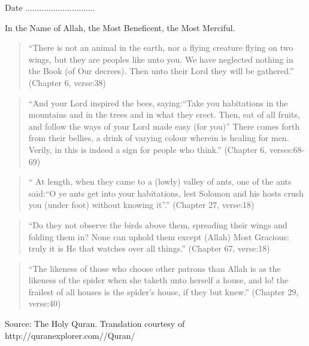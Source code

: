 \begin{titlepage}
\newline
Date ..............................\\
\newpage
\thispagestyle{empty}	
\begin{center}
\noindent
\large
In the Name of Allah, the Most Beneficent, the Most Merciful.
\HRule
\end{center}
\begin{verse}
``There is not an animal in the earth, nor a flying creature flying on two wings, but they are peoples like unto you. We have neglected nothing in the Book (of Our decrees). Then unto their Lord they will be gathered.'' (Chapter 6, verse:38)
\end{verse}

\begin{verse}
``And your Lord inspired the bees, saying:``Take you habitations in the mountains and in the trees and in what they erect. Then, eat of all fruits, and follow the ways of your Lord made easy (for you)'' There comes forth from their bellies, a drink of varying colour wherein is healing for men. Verily, in this is indeed a sign for people who think.''
(Chapter 6, verses:68-69)
\end{verse}

\begin{verse}
`` At length, when they came to a (lowly) valley of ants, one of the ants said:``O ye ants get into your habitations, lest Solomon and his hosts crush you (under foot) without knowing it''.''
(Chapter 27, verse:18) 
\end{verse}

\begin{verse}
``Do they not observe the birds above them, spreading their wings and folding them in? None can uphold them except (Allah) Most Gracious: truly it is He that watches over all things.'' 
(Chapter 67, verse:18)
\end{verse}

\begin{verse}
``The likeness of those who choose other patrons than Allah is as the likeness of the spider when she taketh unto herself a house, and lo! the frailest of all houses is the spider's house, if they but knew.''
(Chapter 29, verse:40) 
\end{verse}
\HRule
\newline
Source: The Holy Quran. Translation courtesy of http://quranexplorer.com//Quran/
\end{titlepage}
